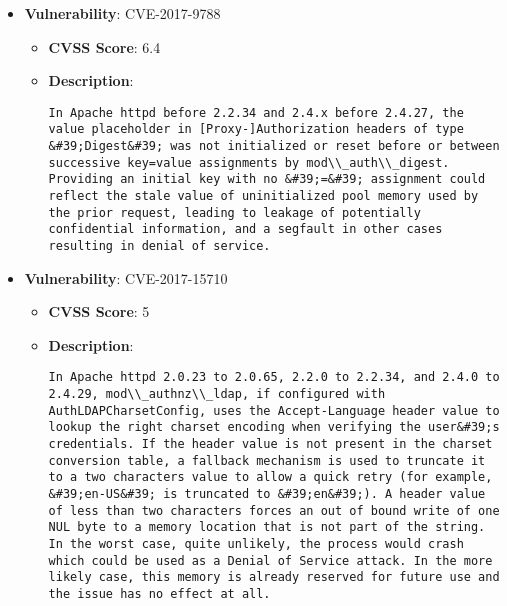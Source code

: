 \documentclass{article}
\begin{document}
\begin{itemize}
        \item \textbf{Vulnerability}: CVE-2017-9788
        \begin{itemize}
            \item \textbf{CVSS Score}:  6.4 
            \item \textbf{Description}:
            \parbox[t]{0.9\linewidth}{
                \verb|In Apache httpd before 2.2.34 and 2.4.x before 2.4.27, the value placeholder in [Proxy-]Authorization headers of type &#39;Digest&#39; was not initialized or reset before or between successive key=value assignments by mod\\_auth\\_digest. Providing an initial key with no &#39;=&#39; assignment could reflect the stale value of uninitialized pool memory used by the prior request, leading to leakage of potentially confidential information, and a segfault in other cases resulting in denial of service.|
            }
        \end{itemize}
    
        \item \textbf{Vulnerability}: CVE-2017-15710
        \begin{itemize}
            \item \textbf{CVSS Score}:  5 
            \item \textbf{Description}:
            \parbox[t]{0.9\linewidth}{
                \verb|In Apache httpd 2.0.23 to 2.0.65, 2.2.0 to 2.2.34, and 2.4.0 to 2.4.29, mod\\_authnz\\_ldap, if configured with AuthLDAPCharsetConfig, uses the Accept-Language header value to lookup the right charset encoding when verifying the user&#39;s credentials. If the header value is not present in the charset conversion table, a fallback mechanism is used to truncate it to a two characters value to allow a quick retry (for example, &#39;en-US&#39; is truncated to &#39;en&#39;). A header value of less than two characters forces an out of bound write of one NUL byte to a memory location that is not part of the string. In the worst case, quite unlikely, the process would crash which could be used as a Denial of Service attack. In the more likely case, this memory is already reserved for future use and the issue has no effect at all.|
            }
        \end{itemize}
    

\end{itemize}
\end{document}
